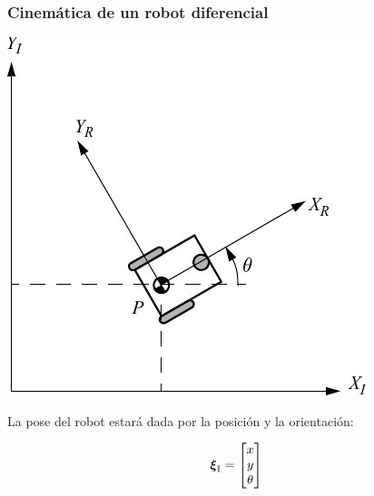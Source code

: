 \begin{frame}
    \frametitle{Cinemática de un robot diferencial}

    \begin{center}
        \includegraphics[width=0.4\columnwidth]{./images/coordinate_systems.pdf}
    \end{center}

    La pose del robot estará dada por la posición y la orientación:

    \begin{equation*}
        \prescript{\mathrm{}}{}{{\boldsymbol{\mathbf{\xi}}}_\mathrm{I}} =
        \begin{bmatrix}
            x\\
            y\\
            \theta
        \end{bmatrix}
    \end{equation*}
\end{frame}


